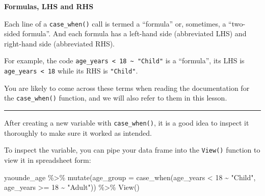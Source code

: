 \documentclass[
  letterpaper,
  DIV=11,
  numbers=noendperiod]{scrreprt}
\newenvironment{Shaded}{\begin{snugshade}}{\end{snugshade}}
\newcommand{\AttributeTok}[1]{\textcolor[rgb]{0.40,0.45,0.13}{#1}}
\newcommand{\DecValTok}[1]{\textcolor[rgb]{0.68,0.00,0.00}{#1}}
\newcommand{\FunctionTok}[1]{\textcolor[rgb]{0.28,0.35,0.67}{#1}}
\newcommand{\NormalTok}[1]{\textcolor[rgb]{0.00,0.23,0.31}{#1}}
\newcommand{\SpecialCharTok}[1]{\textcolor[rgb]{0.37,0.37,0.37}{#1}}
\newcommand{\StringTok}[1]{\textcolor[rgb]{0.13,0.47,0.30}{#1}}
\begin{document}
\begin{tcolorbox}[enhanced jigsaw, titlerule=0mm, colback=white, left=2mm, breakable, opacitybacktitle=0.6, colbacktitle=quarto-callout-note-color!10!white, colframe=quarto-callout-note-color-frame, bottomtitle=1mm, opacityback=0, coltitle=black, arc=.35mm, toptitle=1mm, title=\textcolor{quarto-callout-note-color}{\faInfo}\hspace{0.5em}{Vocab}, leftrule=.75mm, toprule=.15mm, bottomrule=.15mm, rightrule=.15mm]

\textbf{Formulas, LHS and RHS}

Each line of a \texttt{case\_when()} call is termed a ``formula'' or,
sometimes, a ``two-sided formula''. And each formula has a left-hand
side (abbreviated LHS) and right-hand side (abbreviated RHS).

For example, the code
\texttt{age\_years\ \textless{}\ 18\ \textasciitilde{}\ "Child"} is a
``formula'', its LHS is \texttt{age\_years\ \textless{}\ 18} while its
RHS is \texttt{"Child"}.

You are likely to come across these terms when reading the documentation
for the \texttt{case\_when()} function, and we will also refer to them
in this lesson.

\end{tcolorbox}

\begin{center}\rule{0.5\linewidth}{0.5pt}\end{center}

After creating a new variable with \texttt{case\_when()}, it is a good
idea to inspect it thoroughly to make sure it worked as intended.

To inspect the variable, you can pipe your data frame into the
\texttt{View()} function to view it in spreadsheet form:

\begin{Shaded}
\begin{Highlighting}[]
\NormalTok{yaounde\_age }\SpecialCharTok{\%\textgreater{}\%}  
  \FunctionTok{mutate}\NormalTok{(}\AttributeTok{age\_group =} \FunctionTok{case\_when}\NormalTok{(age\_years }\SpecialCharTok{\textless{}} \DecValTok{18} \SpecialCharTok{\textasciitilde{}} \StringTok{"Child"}\NormalTok{, }
\NormalTok{                               age\_years }\SpecialCharTok{\textgreater{}=} \DecValTok{18} \SpecialCharTok{\textasciitilde{}} \StringTok{"Adult"}\NormalTok{)) }\SpecialCharTok{\%\textgreater{}\%} 
  \FunctionTok{View}\NormalTok{()}
\end{Highlighting}
\end{Shaded}
\end{document}
